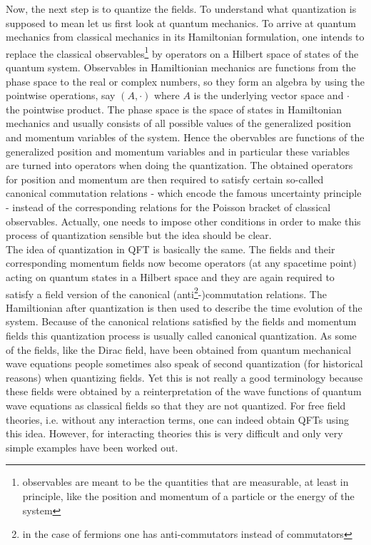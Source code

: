 Now, the next step is to quantize the fields. To understand what quantization is supposed to mean let us first look at quantum mechanics. To arrive at quantum mechanics from classical mechanics in its Hamiltonian formulation, one intends to replace the classical observables\footnote{observables are meant to be the quantities that are measurable, at least in principle, like the position and momentum of a particle or the energy of the system} by operators on a Hilbert space of states of the quantum system. Observables in Hamiltionian mechanics are functions from the phase space to the real or complex numbers, so they form an algebra by using the pointwise operations, say $(A,\cdot)$ where $A$ is the underlying vector space and $\cdot$ the pointwise product. The phase space is the space of states in Hamiltonian mechanics and usually consists of all possible values of the generalized position and momentum variables of the system. Hence the obervables are functions of the generalized position and momentum variables and in particular these variables are turned into operators when doing the quantization. The obtained operators for position and momentum are then required to satisfy certain so-called canonical commutation relations - which encode the famous uncertainty principle - instead of the corresponding relations for the Poisson bracket of classical observables. Actually, one needs to impose other conditions in order to make this process of quantization sensible but the idea should be clear.
\\
The idea of quantization in QFT is basically the same. The fields and their corresponding momentum fields now become operators (at any spacetime point) acting on quantum states in a Hilbert space and they are again required to satisfy a field version of the canonical (anti\footnote{in the case of fermions one has anti-commutators instead of commutators}-)commutation relations. The Hamiltionian after quantization is then used to describe the time evolution of the system. Because of the canonical relations satisfied by the fields and momentum fields this quantization process is usually called canonical quantization. As some of the fields, like the Dirac field, have been obtained from quantum mechanical wave equations people sometimes also speak of second quantization (for historical reasons) when quantizing fields. Yet this is not really a good terminology because these fields were obtained by a reinterpretation of the wave functions of quantum wave equations as classical fields so that they are not quantized. For free field theories, i.e. without any interaction terms, one can indeed obtain QFTs using this idea. However, for interacting theories this is very difficult and only very simple examples have been worked out.
